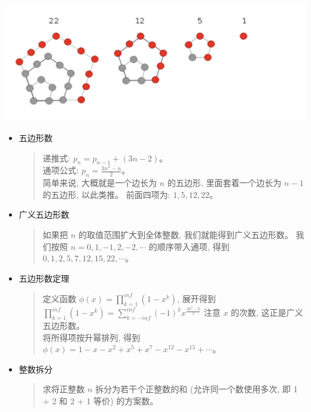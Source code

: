 \documentclass[a4paper,12pt]{article}
\begin{document}
\includegraphics[scale=0.8]{五边形数1.png}

\begin{itemize}
    \item 
        五边形数
        \begin{quote}
            递推式: \(p_n = p_{n-1} + (3n - 2)\)。\\

            通项公式: \(p_n = \frac{3n^2 - n}{2}\)。\\

            简单来说, 大概就是一个边长为 \(n\) 的五边形, 里面套着一个边长为 \(n-1\) 的五边形, 以此类推。
            前面四项为: \(1,5,12,22\)。
        \end{quote}

    \item
        广义五边形数
        \begin{quote}
            如果把 \(n\) 的取值范围扩大到全体整数, 我们就能得到广义五边形数。
            我们按照 \(n = 0, 1, -1, 2, -2, \cdots \) 的顺序带入通项, 得到 \(0,1,2,5,7,12,15,22, \cdots\)。
        \end{quote}
    
    \item 
        五边形数定理
        \begin{quote}
            定义函数 \(\phi(x) = \prod_{k=1}^{inf} (1-x^k)\), 
            展开得到 \(\prod_{k=1}^{inf} (1-x^k) = \sum_{k=-inf}^{inf} (-1)^k x^{\frac{3k^2-k}{2}}\)
            注意 \(x\) 的次数, 这正是广义五边形数。\\

            将所得项按升幂排列, 得到 \(\phi(x) = 1 - x - x^2 + x^5 + x^7 - x^{12} - x^{15} + \cdots \)。
        \end{quote}   
        
    \item 
        整数拆分
        \begin{quote}
            求将正整数 \(n\) 拆分为若干个正整数的和 (允许同一个数使用多次, 即 1 + 2 和 2 + 1 等价) 的方案数。
            \\


\end{quote}
\end{itemize}
\end{document}
